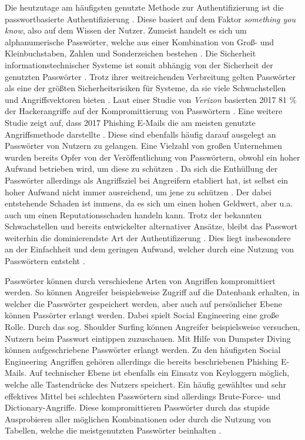     Die heutzutage am häufigsten genutzte Methode zur Authentifizierung ist die passwortbasierte Authentifizierung \cite{chanda2016password} \cite{boonkrong2012security} \cite{yildirim2019encouraging}. Diese basiert auf dem Faktor \textit{something you know}, also auf dem Wissen der Nutzer. Zumeist handelt es sich um alphanumerische Passwörter, welche aus einer Kombination von Groß- und Kleinbuchstaben, Zahlen und Sonderzeichen bestehen \cite{chanda2016password}. Die Sicherheit informationstechnischer Systeme ist somit abhängig von der Sicherheit der genutzten Passwörter \cite{boonkrong2012security}. Trotz ihrer weitreichenden Verbreitung gelten Passwörter als eine der größten Sicherheitsrisiken für Systeme, da sie viele Schwachstellen und Angriffsvektoren bieten \cite{yildirim2019encouraging} \cite{farke2020you}. Laut einer Studie von \textit{Verizon} basierten 2017 81 \% der Hackerangriffe auf der Kompromittierung von Passwörtern \cite{barbosa2021provable} \cite{verizon2017}. Eine weitere Studie zeigt auf, dass 2017 Phishing E-Mails die am meisten genutzte Angriffsmethode darstellte \cite{Symantec} \cite{barbosa2021provable}. Diese sind ebenfalls häufig darauf ausgelegt an Passwörter von Nutzern zu gelangen. Eine Vielzahl von großen Unternehmen wurden bereits Opfer von der Veröffentlichung von Passwörtern, obwohl ein hoher Aufwand betrieben wird, um diese zu schützen \cite{boonkrong2012security}. Da sich die Enthüllung der Passwörter allerdings als Angriffsziel bei Angreifern etabliert hat, ist selbst ein hoher Aufwand nicht immer ausreichend, um jene zu schützen \cite{boonkrong2012security}. Der dabei entstehende Schaden ist immens, da es sich um einen hohen Geldwert, aber u.a. auch um einen Reputationsschaden handeln kann. Trotz der bekannten Schwachstellen und bereits entwickelter alternativer Ansätze, bleibt das Passwort weiterhin die dominierendste Art der Authentifizerung \cite{ives2004domino}. Dies liegt insbesondere an der Einfachheit und dem geringen Aufwand, welcher durch eine Nutzung von Passwörtern entsteht \cite{yildirim2019encouraging}.

    Passwörter können durch verschiedene Arten von Angriffen kompromittiert werden. So können Angreifer beispielsweise Zugriff auf die Datenbank erhalten, in welcher die Passwörter gespeichert werden, aber auch auf persönlicher Ebene können Passörter erlangt werden. Dabei spielt Social Engineering eine große Rolle. Durch das sog. Shoulder Surfing können Angreifer beispielsweise versuchen, Nutzern beim Passwort eintippen zuzuschauen. Mit Hilfe von Dumpster Diving können aufgeschriebene Passwörter erlangt werden. Zu den häufigsten Social Engineering Angriffen gehören allerdings die bereits beschriebenen Phishing E-Mails. Auf technischer Ebene ist ebenfalls ein Einsatz von Keyloggern möglich, welche alle Tastendrücke des Nutzers speichert. Ein häufig gewähltes und sehr effektives Mittel bei schlechten Passwörtern sind allerdings Brute-Force- und Dictionary-Angriffe. Diese kompromittieren Passwörter durch das stupide Ausprobieren aller möglichen Kombinationen oder durch die Nutzung von Tabellen, welche die meistgenutzten Passwörter beinhalten \cite{chanda2016password} \cite{morii2017research}.

